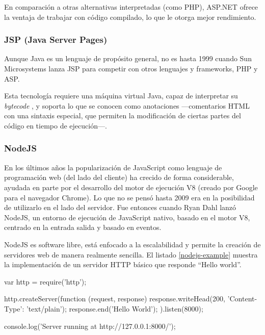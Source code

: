 En comparación a otras alternativas interpretadas (como PHP), ASP.NET ofrece la ventaja de trabajar con código compilado, lo que le otorga mejor rendimiento.

\subsubsection{JSP (Java Server Pages)}

Aunque Java es un lenguaje de propósito general, no es hasta 1999 cuando Sun Microsystems lanza \acs{JSP} para competir con otros lenguajes y frameworks, PHP y \acs{ASP}.

Esta tecnología requiere una máquina virtual Java, capaz de interpretar su {\it bytecode} , y soporta lo que se conocen como anotaciones ---comentarios \acs{HTML} con una sintaxis especial, que permiten la modificación de ciertas partes del código en tiempo de ejecución---.

\subsubsection{NodeJS}

En los últimos años la popularización de JavaScript como lenguaje de programación web (del lado del cliente) ha crecido de forma considerable, ayudada en parte por el desarrollo del motor de ejecución V8 (creado por Google para el navegador Chrome). Lo que no se pensó hasta 2009 era en la posibilidad de utilizarlo en el lado del servidor. Fue entonces cuando Ryan Dahl lanzó NodeJS, un entorno de ejecución de JavaScript nativo, basado en el motor V8, centrado en la entrada salida y basado en eventos.

NodeJS es software libre, está enfocado a la escalabilidad y permite la creación de servidores web de manera realmente sencilla. El listado \ref{nodejs-example} muestra la implementación de un servidor \acs{HTTP} básico que responde ``Hello world''.

\begin{listing}[language=javascript, caption={Servidor web básico implementado con NodeJS}, label=nodejs-example]
var http = require('http');
 
http.createServer(function (request, response) {
    response.writeHead(200, {'Content-Type': 'text/plain'});
    response.end('Hello World\n');
}).listen(8000);
 
console.log('Server running at http://127.0.0.1:8000/');
\end{listing}

